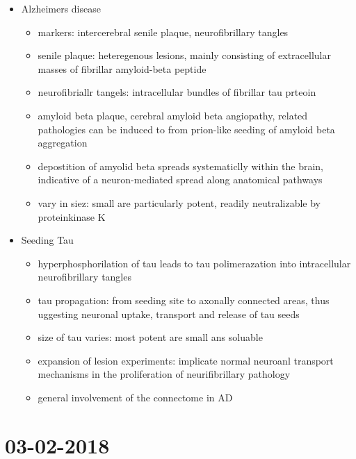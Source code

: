 \documentclass[fleqn]{article}\usepackage{caption}
\begin{document}
\begin{itemize}
\item Alzheimers disease 
\begin{itemize}
\item markers: intercerebral senile plaque, neurofibrillary tangles
\item senile plaque: heteregenous lesions, mainly consisting of extracellular masses of fibrillar amyloid-beta peptide
\item neurofibriallr tangels: intracellular bundles of fibrillar tau prteoin
\item amyloid beta plaque, cerebral amyloid beta angiopathy, related pathologies can be induced to from prion-like seeding of amyloid beta aggregation
\item depostition of amyolid beta spreads systematiclly within the brain, indicative of a neuron-mediated spread along anatomical pathways
\item vary in siez: small are particularly potent, readily neutralizable by proteinkinase K
\end{itemize}
\item Seeding Tau
\begin{itemize}
\item hyperphosphorilation of tau leads to tau polimerazation into intracellular neurofibrillary tangles
\item tau propagation: from seeding site to axonally connected areas, thus uggesting neuronal uptake, transport and release of tau seeds
\item size of tau varies: most potent are small ans soluable
\item expansion of lesion experiments: implicate normal neuroanl transport mechanisms in the proliferation of neurifibrillary pathology
\item general involvement of the connectome in AD
\end{itemize} 
\end{itemize}


\section{03-02-2018}
\end{document}
